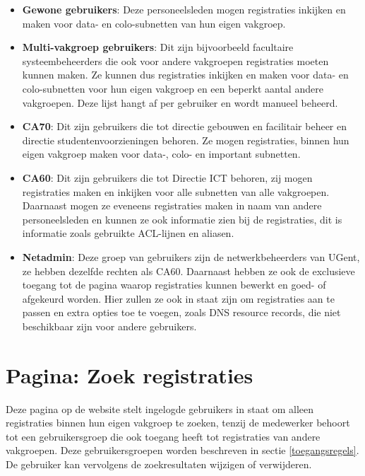 \begin{itemize}
    \item \textbf{Gewone gebruikers}: Deze personeelsleden mogen registraties inkijken en maken voor data- en colo-subnetten van hun eigen vakgroep.
    \item \textbf{Multi-vakgroep gebruikers}: Dit zijn bijvoorbeeld facultaire systeembeheerders die ook voor andere vakgroepen registraties moeten kunnen maken. Ze kunnen dus registraties inkijken en maken voor data- en colo-subnetten voor hun eigen vakgroep en een beperkt aantal andere vakgroepen. Deze lijst hangt af per gebruiker en wordt manueel beheerd.
    \item \textbf{CA70}: Dit zijn gebruikers die tot directie gebouwen en facilitair beheer en directie studentenvoorzieningen behoren. Ze mogen registraties, binnen hun eigen vakgroep maken voor data-, colo- en important subnetten.
    \item \textbf{CA60}: Dit zijn gebruikers die tot Directie ICT behoren, zij mogen registraties maken en inkijken voor alle subnetten van alle vakgroepen. Daarnaast mogen ze eveneens registraties maken in naam van andere personeelsleden en kunnen ze ook informatie zien bij de registraties, dit is informatie zoals gebruikte ACL-lijnen en aliasen.
    \item \textbf{Netadmin}: Deze groep van gebruikers zijn de netwerkbeheerders van UGent, ze hebben dezelfde rechten als CA60. Daarnaast hebben ze ook de exclusieve toegang tot de pagina waarop registraties kunnen bewerkt en goed- of afgekeurd worden. Hier zullen ze ook in staat zijn om registraties aan te passen en extra opties toe te voegen, zoals DNS resource records, die niet beschikbaar zijn voor andere gebruikers.
\end{itemize}

\section{Pagina: Zoek registraties}
\label{zoek-registraties}
Deze pagina op de website stelt ingelogde gebruikers in staat om alleen registraties binnen hun eigen vakgroep te zoeken, tenzij de medewerker behoort tot een gebruikersgroep die ook toegang heeft tot registraties van andere vakgroepen. Deze gebruikersgroepen worden beschreven in sectie \ref{toegangsregels}. De gebruiker kan vervolgens de zoekresultaten wijzigen of verwijderen.
